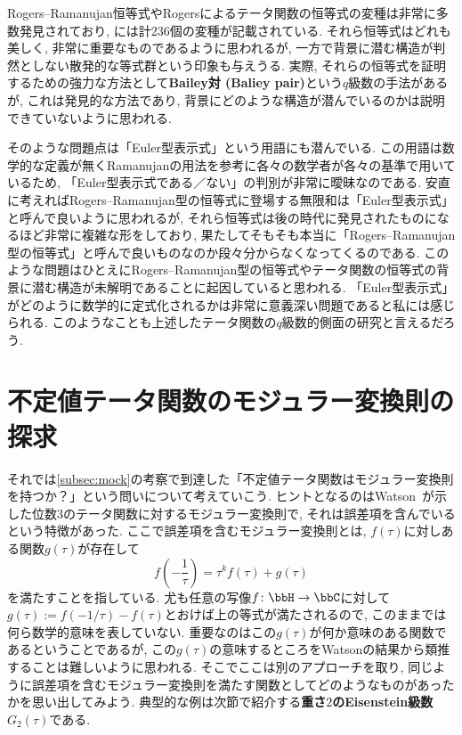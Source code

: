 \documentclass[11pt,b5paper,oneside,lualatex]{ltjsarticle} %
\numberwithin{equation}{section} %
\begin{document}
\begin{rem}
	Rogers--Ramanujan恒等式やRogersによるテータ関数の恒等式の変種は非常に多数発見されており, \cite[付録A]{魅惑}には計236個の変種が記載されている. 
	それら恒等式はどれも美しく, 非常に重要なものであるように思われるが, 一方で背景に潜む構造が判然としない散発的な等式群という印象も与えうる. 
	実際, それらの恒等式を証明するための強力な方法として\textbf{Bailey対 (Baliey pair)}という$ q $級数の手法があるが, これは発見的な方法であり, 背景にどのような構造が潜んでいるのかは説明できていないように思われる. 
	
	そのような問題点は「Euler型表示式」という用語にも潜んでいる. 
	この用語は数学的な定義が無くRamanujanの用法を参考に各々の数学者が各々の基準で用いているため, 「Euler型表示式である／ない」の判別が非常に曖昧なのである. 
	安直に考えればRogers--Ramanujan型の恒等式に登場する無限和は「Euler型表示式」と呼んで良いように思われるが, それら恒等式は後の時代に発見されたものになるほど非常に複雑な形をしており, 果たしてそもそも本当に「Rogers--Ramanujan型の恒等式」と呼んで良いものなのか段々分からなくなってくるのである. 
	このような問題はひとえにRogers--Ramanujan型の恒等式やテータ関数の恒等式の背景に潜む構造が未解明であることに起因していると思われる. 
	「Euler型表示式」がどのように数学的に定式化されるかは非常に意義深い問題であると私には感じられる. 
	このようなことも上述したテータ関数の$ q $級数的側面の研究と言えるだろう. 
\end{rem}


\section{不定値テータ関数のモジュラー変換則の探求} \label{sec:indefinite_theta}


それでは\cref{subsec:mock}の考察で到達した「不定値テータ関数はモジュラー変換則を持つか？」という問いについて考えていこう. 
ヒントとなるのはWatson~\cite[pp. 78]{Watson}が示した位数$ 3 $のテータ関数に対するモジュラー変換則で, それは誤差項を含んでいるという特徴があった.
ここで誤差項を含むモジュラー変換則とは, $ f(\tau) $に対しある関数$ g(\tau) $が存在して
\[
f \left( -\frac{1}{\tau} \right) = \tau^k f(\tau) + g(\tau)
\]
を満たすことを指している. 
尤も任意の写像$ f \colon \bbH \to \bbC $に対して$ g(\tau) := f(-1/\tau) - f(\tau) $とおけば上の等式が満たされるので, このままでは何ら数学的意味を表していない. 
重要なのはこの$ g(\tau) $が何か意味のある関数であるということであるが, この$ g(\tau) $の意味するところをWatsonの結果から類推することは難しいように思われる. 
そこでここは別のアプローチを取り, 同じように誤差項を含むモジュラー変換則を満たす関数としてどのようなものがあったかを思い出してみよう. 
典型的な例は次節で紹介する\textbf{重さ$ 2 $のEisenstein級数}$ G_2(\tau) $である. 
\end{document}
